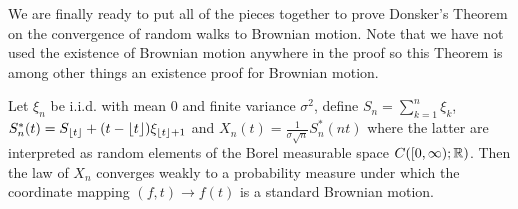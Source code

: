 We are finally ready to put all of the pieces together to prove
Donsker's Theorem on the convergence of random walks to Brownian
motion.  Note that we have not used the existence of Brownian motion
anywhere in the proof so this Theorem is among other things an
existence proof for Brownian motion.
\begin{thm}\label{Donsker2}Let $\xi_n$ be i.i.d. with mean $0$ and finite variance
  $\sigma^2$, define $S_n = \sum_{k=1}^n \xi_k$, $S_n^*(t) =
  S_{\lfloor t \rfloor} + (t - \lfloor t \rfloor)\xi_{\lfloor t \rfloor+1}$ and
  $X_n(t) = \frac{1}{\sigma \sqrt{n}} S_n^*(nt)$ where the latter are
  interpreted as random elements of the Borel measurable space
  $C([0,\infty);\mathbb{R})$.  
Then the law of $X_n$  converges weakly to a probability measure under
which the coordinate mapping $(f,t) \to f(t)$ is a standard Brownian motion.
\end{thm}
